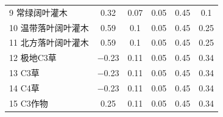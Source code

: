 \begin{table}[htbp]
\begin{tabular}{@{}lccccc@{}}
    9 常绿阔叶灌木    & 0.32                   & 0.07                           & 0.05                           & 0.45                           & 0.1                             \\
    10 温带落叶阔叶灌木 & 0.59                   & 0.1                            & 0.05                           & 0.45                           & 0.25                            \\
    11 北方落叶阔叶灌木 & 0.59                   & 0.1                            & 0.05                           & 0.45                           & 0.25                            \\
    12 极地C3草    & \num{ -0.23   }               & 0.11                           & 0.05                           & 0.45                           & 0.34                            \\
    13 C3草      & \num{ -0.23   }               & 0.11                           & 0.05                           & 0.45                           & 0.34                            \\
    14 C4草      & \num{ -0.23   }               & 0.11                           & 0.05                           & 0.45                           & 0.34                            \\
    15 C3作物     & 0.25                   & 0.11                           & 0.05                           & 0.45                           & 0.34                            \\ \bottomrule
    \end{tabular}
    \end{table}
    

    

